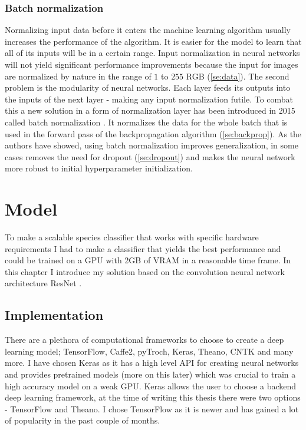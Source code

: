 \documentclass[times, utf8, diplomski]{fer}
\begin{document}
\subsection{Batch normalization}
\label{se:batch_norm}

Normalizing input data before it enters the machine learning algorithm usually increases the performance of the algorithm. It is easier for the model to learn that all of its inputs will be in a certain range. Input normalization in neural networks will not yield significant performance improvements because the input for images are normalized by nature in the range of $1$ to $255$ RGB (\ref{se:data}). The second problem is the modularity of neural networks. Each layer feeds its outputs into the inputs of the next layer - making any input normalization futile. To combat this a new solution in a form of normalization layer has been introduced in 2015 called batch normalization \citep{ioffe_batch_2015}. It normalizes the data for the whole batch that is used in the forward pass of the backpropagation algorithm (\ref{se:backprop}). As the authors have showed, using batch normalization improves generalization, in some cases removes the need for dropout (\ref{se:dropout}) and makes the neural network more robust to initial hyperparameter initialization.

\chapter{Model}
\label{se:model}
To make a scalable species classifier that works with specific hardware requirements I had to make a classifier that yields the best performance and could be trained on a GPU with 2GB of VRAM in a reasonable time frame. In this chapter I introduce my solution based on the convolution neural network architecture ResNet \citep{he_deep_2016}.


\section{Implementation}

There are a plethora of computational  frameworks to choose to create a deep learning model; TensorFlow, Caffe2, pyTroch, Keras, Theano, CNTK and many more. I have chosen Keras as it has a high level API for creating neural networks and provides pretrained models (more on this later) which was crucial to train a high accuracy model on a weak GPU. Keras allows the user to choose a backend deep learning framework, at the time of writing this thesis there were two options - TensorFlow and Theano. I chose TensorFlow as it is newer and has gained a lot of popularity in the past couple of months.
\end{document}
